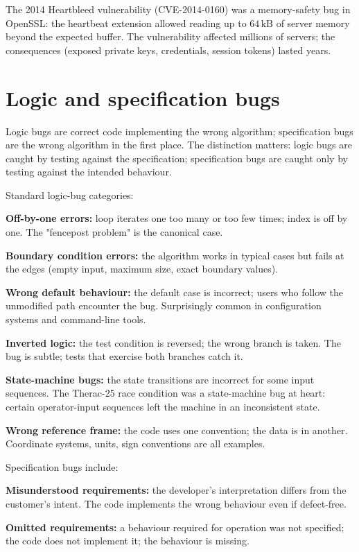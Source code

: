 The 2014 Heartbleed vulnerability (CVE-2014-0160) was a memory-safety bug in OpenSSL: the heartbeat extension allowed reading up to $64\,\text{kB}$ of server memory beyond the expected buffer. The vulnerability affected millions of servers; the consequences (exposed private keys, credentials, session tokens) lasted years.

\section{Logic and specification bugs}

Logic bugs are correct code implementing the wrong algorithm; specification bugs are the wrong algorithm in the first place. The distinction matters: logic bugs are caught by testing against the specification; specification bugs are caught only by testing against the intended behaviour.

Standard logic-bug categories:

\textbf{Off-by-one errors:} loop iterates one too many or too few times; index is off by one. The "fencepost problem" is the canonical case.

\textbf{Boundary condition errors:} the algorithm works in typical cases but fails at the edges (empty input, maximum size, exact boundary values).

\textbf{Wrong default behaviour:} the default case is incorrect; users who follow the unmodified path encounter the bug. Surprisingly common in configuration systems and command-line tools.

\textbf{Inverted logic:} the test condition is reversed; the wrong branch is taken. The bug is subtle; tests that exercise both branches catch it.

\textbf{State-machine bugs:} the state transitions are incorrect for some input sequences. The Therac-25 race condition was a state-machine bug at heart: certain operator-input sequences left the machine in an inconsistent state.

\textbf{Wrong reference frame:} the code uses one convention; the data is in another. Coordinate systems, units, sign conventions are all examples.

Specification bugs include:

\textbf{Misunderstood requirements:} the developer's interpretation differs from the customer's intent. The code implements the wrong behaviour even if defect-free.

\textbf{Omitted requirements:} a behaviour required for operation was not specified; the code does not implement it; the behaviour is missing.

